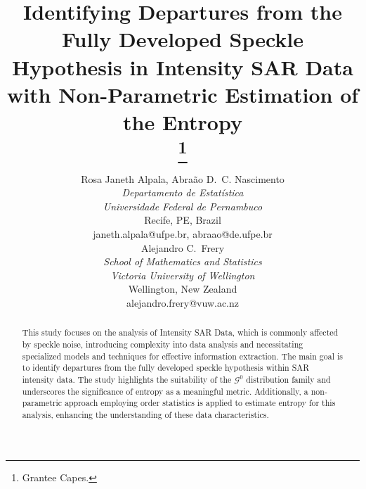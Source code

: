 \documentclass[conference]{IEEEtran}
\begin{document}
\title{Identifying Departures from the Fully Developed Speckle Hypothesis in Intensity SAR Data with Non-Parametric Estimation of the Entropy\\

\thanks{Grantee Capes.}
}

\author{
\begin{minipage}[t]{0.5\textwidth}
\centering
Rosa Janeth Alpala, Abraão D.\ C. Nascimento \\
\textit{Departamento de Estatística} \\
\textit{Universidade Federal de Pernambuco}\\
Recife, PE, Brazil\\
janeth.alpala@ufpe.br, abraao@de.ufpe.br 
\end{minipage}%
\begin{minipage}[t]{0.4\textwidth}
\centering
Alejandro C.\ Frery\\
\textit{School of Mathematics and Statistics} \\
\textit{Victoria University of Wellington}\\
Wellington, New Zealand\\
alejandro.frery@vuw.ac.nz
\end{minipage}
}

\maketitle\begin{abstract}
This study focuses on the analysis of Intensity SAR Data, which is commonly affected by speckle noise, introducing complexity into data analysis and necessitating specialized models and techniques for effective information extraction. 
The main goal is to identify departures from the fully developed speckle hypothesis within SAR intensity data. 
The study highlights the suitability of the $\mathcal{G}^0$ distribution family and underscores the significance of entropy as a meaningful metric. 
Additionally, a non-parametric approach employing order statistics is applied to estimate entropy for this analysis, enhancing the understanding of these data characteristics.
\end{abstract}
\end{document}
